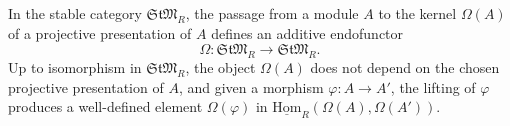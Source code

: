 In the stable category $\mathfrak{StM}_R$, the passage from a module $A$ to the kernel $\Omega(A)$ of a projective presentation of $A$ defines an additive endofunctor
$$
\Omega : \mathfrak{StM}_R \longrightarrow \mathfrak{StM}_R.
$$
Up to isomorphism in $\mathfrak{StM}_R$, the object $\Omega(A)$ does not depend on the chosen projective presentation of $A$, and given a morphism $\varphi: A \to A'$, the lifting of $\varphi$ produces a well-defined element $\Omega(\varphi)$ in $\underline{\mathrm{Hom}}_R(\Omega(A), \Omega(A'))$.
